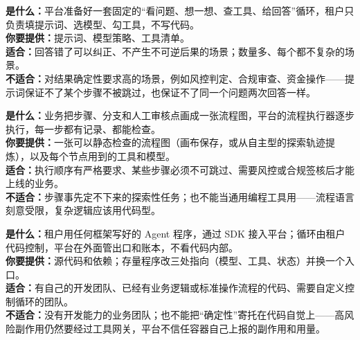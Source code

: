 \Needspace{12.5cm}
\begin{tcbraster}[
  raster columns=2,
  raster equal height=rows,
  raster column skip=4mm,
  raster row skip=4mm
]
\begin{tcolorbox}[
  title={T0 · 问答型 Agent：照本回答},
  colback=PrimaryLight,colframe=Primary,coltitle=white,
  fonttitle=\bfseries\sffamily,fontupper=\small,
  left=2.5mm,right=2.5mm,top=1.5mm,bottom=1.5mm
]
\textbf{是什么：}平台准备好一套固定的“看问题、想一想、查工具、给回答”循环，租户只负责填提示词、选模型、勾工具，不写代码。\\
\textbf{你要提供：}提示词、模型策略、工具清单。\\
\textbf{适合：}回答错了可以纠正、不产生不可逆后果的场景；数量多、每个都不复杂的场景。\\
\textbf{不适合：}对结果确定性要求高的场景，例如风控判定、合规审查、资金操作——提示词保证不了某个步骤不被跳过，也保证不了同一个问题两次回答一样。
\end{tcolorbox}
\begin{tcolorbox}[
  title={T1 · 流程型 Agent：按单办事},
  colback=GreenLight,colframe=Green,coltitle=white,
  fonttitle=\bfseries\sffamily,fontupper=\small,
  left=2.5mm,right=2.5mm,top=1.5mm,bottom=1.5mm
]
\textbf{是什么：}业务把步骤、分支和人工审核点画成一张流程图，平台的流程执行器逐步执行，每一步都有记录、都能检查。\\
\textbf{你要提供：}一张可以静态检查的流程图（画布保存，或从自主型的探索轨迹提炼），以及每个节点用到的工具和模型。\\
\textbf{适合：}执行顺序有严格要求、某些步骤必须不可跳过、需要风控或合规签核后才能上线的业务。\\
\textbf{不适合：}步骤事先定不下来的探索性任务；也不能当通用编程工具用——流程语言刻意受限，复杂逻辑应该用代码型。
\end{tcolorbox}
\begin{tcolorbox}[
  title={T2 · 代码型 Agent：自带程序入驻},
  colback=GoldLight,colframe=Gold,coltitle=white,
  fonttitle=\bfseries\sffamily,fontupper=\small,
  left=2.5mm,right=2.5mm,top=1.5mm,bottom=1.5mm
]
\textbf{是什么：}租户用任何框架写好的 Agent 程序，通过 SDK 接入平台；循环由租户代码控制，平台在外面管出口和账本，不看代码内部。\\
\textbf{你要提供：}源代码和依赖；存量程序改三处指向（模型、工具、状态）并换一个入口。\\
\textbf{适合：}有自己的开发团队、已经有业务逻辑或标准操作流程的代码、需要自定义控制循环的团队。\\
\textbf{不适合：}没有开发能力的业务团队；也不能把“确定性”寄托在代码自觉上——高风险副作用仍然要经过工具网关，平台不信任容器自己上报的副作用和用量。

\end{tcolorbox}
\end{tcbraster}
